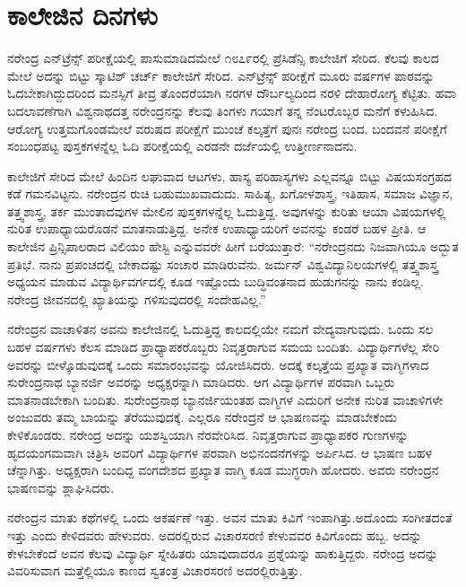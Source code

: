 
\chapter{ಕಾಲೇಜಿನ ದಿನಗಳು}

ನರೇಂದ್ರ ಎನ್‍ಟ್ರೆನ್ಸ್ ಪರೀಕ್ಷೆಯಲ್ಲಿ ಪಾಸುಮಾಡಿದಮೇಲೆ ೧೮೭೯ರಲ್ಲಿ ಪ್ರೆಸಿಡೆನ್ಸಿ ಕಾಲೇಜಿಗೆ ಸೇರಿದ. ಕೆಲವು ಕಾಲದ ಮೇಲೆ ಅದನ್ನು ಬಿಟ್ಟು ಸ್ಕಾಟಿಶ್ ಚರ್ಚ್ ಕಾಲೇಜಿಗೆ ಸೇರಿದ. ಎನ್‍ಟ್ರೆನ್ಸ್ ಪರೀಕ್ಷೆಗೆ ಮೂರು ವರ್ಷಗಳ ಪಾಠವನ್ನು ಓದಬೇಕಾಗಿದ್ದುದರಿಂದ ಮನಸ್ಸಿಗೆ ತೀವ್ರ ತೊಂದರೆಯಾಗಿ ನರಗಳ ದೌರ್ಬಲ್ಯದಿಂದ ನರಳಿ ದೇಹಾರೋಗ್ಯ ಕೆಟ್ಟಿತು. ಹವಾ ಬದಲಾವಣೆಗಾಗಿ ವಿಶ್ವನಾಥದತ್ತ ನರೇಂದ್ರನನ್ನು ಕೆಲವು ತಿಂಗಳು ಗಯಾಗೆ ತನ್ನ ನೆಂಟರೊಬ್ಬರ ಮನೆಗೆ ಕಳುಹಿಸಿದ. ಆರೋಗ್ಯ ಉತ್ತಮಗೊಂಡಮೇಲೆ ವರುಷದ ಪರೀಕ್ಷೆಗೆ ಮುಂಚೆ ಕಲ್ಕತ್ತೆಗೆ ಪುನಃ ನರೇಂದ್ರ ಬಂದ. ಬಂದವನೆ ಪರೀಕ್ಷೆಗೆ ಸಂಬಂಧಪಟ್ಟ ಪುಸ್ತಕಗಳನ್ನೆಲ್ಲ ಓದಿ ಪರೀಕ್ಷೆಯಲ್ಲಿ ಎರಡನೇ ದರ್ಜೆಯಲ್ಲಿ ಉತ್ತೀರ್ಣನಾದನು.

ಕಾಲೇಜಿಗೆ ಸೇರಿದ ಮೇಲೆ ಹಿಂದಿನ ಲಘುವಾದ ಆಟಗಳು, ಹಾಸ್ಯ ಪರಿಹಾಸ್ಯಗಳು ಎಲ್ಲವನ್ನೂ ಬಿಟ್ಟು ವಿಷಯಸಂಗ್ರಹದ ಕಡೆ ಗಮನವಿಟ್ಟನು. ನರೇಂದ್ರನ ರುಚಿ ಬಹುಮುಖವಾದುದು. ಸಾಹಿತ್ಯ, ಖಗೋಳಶಾಸ್ತ್ರ, ಇತಿಹಾಸ, ಸಮಾಜ ವಿಜ್ಞಾನ, ತತ್ತ್ವಶಾಸ್ತ್ರ, ತರ್ಕ ಮುಂತಾದವುಗಳ ಮೇಲಿನ ಪುಸ್ತಕಗಳನ್ನೆಲ್ಲ ಓದುತ್ತಿದ್ದ. ಅವುಗಳನ್ನು ಕುರಿತು ಆಯಾ ವಿಷಯಗಳಲ್ಲಿ ನುರಿತ ಉಪಾಧ್ಯಾಯರೊಡನೆ ಮಾತನಾಡುತ್ತಿದ್ದ. ಅನೇಕ ಉಪಾಧ್ಯಾಯರಿಗೆ ಅವನನ್ನು ಕಂಡರೆ ಬಹಳ ಪ್ರೀತಿ. ಆ ಕಾಲೇಜಿನ ಪ್ರಿನ್ಸಿಪಾಲರಾದ ವಿಲಿಯಂ ಹೇಸ್ಟಿ ಎನ್ನುವವರೇ ಹೀಗೆ ಬರೆಯುತ್ತಾರೆ: “ನರೇಂದ್ರನದು ನಿಜವಾಗಿಯೂ ಅದ್ಭುತ ಪ್ರತಿಭೆ. ನಾನು ಪ್ರಪಂಚದಲ್ಲಿ ಬೇಕಾದಷ್ಟು ಸಂಚಾರ ಮಾಡಿರುವೆನು. ಜರ್ಮನ್ ವಿಶ್ವವಿದ್ಯಾನಿಲಯಗಳಲ್ಲಿ ತತ್ತ್ವಶಾಸ್ತ್ರ ಅಧ್ಯಯನ ಮಾಡುವ ವಿದ್ಯಾರ್ಥಿವರ್ಗದಲ್ಲಿ ಕೂಡ ಇಷ್ಟೊಂದು ಬುದ್ಧಿವಂತನಾದ ಹುಡುಗನನ್ನು ನಾನು ಕಂಡಿಲ್ಲ. ನರೇಂದ್ರ ಜೀವನದಲ್ಲಿ ಖ್ಯಾತಿಯನ್ನು ಗಳಿಸುವುದರಲ್ಲಿ ಸಂದೇಹವಿಲ್ಲ.”

ನರೇಂದ್ರನ ವಾಚಾಳಿತನ ಅವನು ಕಾಲೇಜಿನಲ್ಲಿ ಓದುತ್ತಿದ್ದ ಕಾಲದಲ್ಲಿಯೇ ನಮಗೆ ವೇದ್ಯವಾಗುವುದು. ಒಂದು ಸಲ ಬಹಳ ವರ್ಷಗಳು ಕೆಲಸ ಮಾಡಿದ ಪ್ರಾಧ್ಯಾಪಕರೊಬ್ಬರು ನಿವೃತ್ತರಾಗುವ ಸಮಯ ಬಂದಿತು. ವಿದ್ಯಾರ್ಥಿಗಳೆಲ್ಲ ಸೇರಿ ಅವರನ್ನು ಬೀಳ್ಕೊಡುವುದಕ್ಕೆ ಒಂದು ಸಮಾರಂಭವನ್ನು ಯೋಜಿಸಿದರು. ಅದಕ್ಕೆ ಕಲ್ಕತ್ತೆಯ ಪ್ರಖ್ಯಾತ ವಾಗ್ಮಿಗಳಾದ ಸುರೇಂದ್ರನಾಥ ಬ್ಯಾನರ್ಜಿ ಅವರನ್ನು ಅಧ್ಯಕ್ಷರನ್ನಾಗಿ ಮಾಡಿದರು. ಆಗ ವಿದ್ಯಾರ್ಥಿಗಳ ಪರವಾಗಿ ಒಬ್ಬರು ಮಾತನಾಡಬೇಕಾಗಿ ಬಂದಿತು. ಸುರೇಂದ್ರನಾಥ ಬ್ಯಾನರ್ಜಿಯಂತಹ ವಾಗ್ಮಿಗಳ ಎದುರಿಗೆ ಅನೇಕ ನುರಿತ ವಾಚಾಳಿಗಳೇ ಅಂಜುವರು ತಮ್ಮ ಬಾಯನ್ನು ತೆರೆಯುವುದಕ್ಕೆ. ಎಲ್ಲರೂ ನರೇಂದ್ರನೆ ಆ ಭಾಷಣವನ್ನು ಮಾಡಬೇಕೆಂದು ಕೇಳಿಕೊಂಡರು. ನರೇಂದ್ರ ಅದನ್ನು ಯಶಸ್ವಿಯಾಗಿ ನೆರವೇರಿಸಿದ. ನಿವೃತ್ತರಾಗುವ ಪ್ರಾಧ್ಯಾಪಕರ ಗುಣಗಳನ್ನು ಹೃದಯಂಗಮವಾಗಿ ಚಿತ್ರಿಸಿ ಅವರಿಗೆ ವಿದ್ಯಾರ್ಥಿಗಳ ಪರವಾಗಿ ಅಭಿನಂದನೆಗಳನ್ನು ಅರ್ಪಿಸಿದ. ಆ ಭಾಷಣ ಬಹಳ ಚೆನ್ನಾಗಿತ್ತು. ಅಧ್ಯಕ್ಷರಾಗಿ ಬಂದಿದ್ದ ವಂಗದೇಶದ ಪ್ರಖ್ಯಾತ ವಾಗ್ಮಿ ಕೂಡ ಮುಗ್ಧರಾಗಿ ಹೋದರು. ಅವರು ನರೇಂದ್ರನ ಭಾಷಣವನ್ನು ಶ್ಲಾಘಿಸಿದರು.

ನರೇಂದ್ರನ ಮಾತು ಕಥೆಗಳಲ್ಲಿ ಒಂದು ಆಕರ್ಷಣೆ ಇತ್ತು. ಅವನ ಮಾತು ಕಿವಿಗೆ ಇಂಪಾಗಿತ್ತು.ಅದೊಂದು ಸಂಗೀತದಂತೆ ಇತ್ತು ಎಂದು ಕೇಳಿದವರು ಹೇಳುವರು. ಅದರಲ್ಲಿರುವ ವಿಚಾರಸರಣಿ ಕೇಳುವವರ ಕಿವಿಗೊಂದು ಹಬ್ಬ. ಅದನ್ನು ಕೇಳಬೇಕೆಂದೆ ಅವನ ಕೆಲವು ವಿದ್ಯಾರ್ಥಿ ಸ್ನೇಹಿತರು ಯಾವುದಾದರೂ ಪ್ರಶ್ನೆಯನ್ನು ಹಾಕುತ್ತಿದ್ದರು. ನರೇಂದ್ರ ಅದನ್ನು ವಿವರಿಸುವಾಗ ಮತ್ತೆಲ್ಲಿಯೂ ಕಾಣದ ಸ್ವತಂತ್ರ ವಿಚಾರಸರಣಿ ಅದರಲ್ಲಿರುತ್ತಿತ್ತು.

